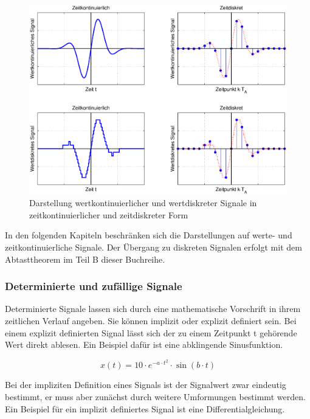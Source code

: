 \begin{figure}[H]
  \includegraphics[width=1.0\textwidth]{Kapitel1/Bilder/image1.eps}
  \caption{Darstellung wertkontinuierlicher und wertdiskreter Signale in zeitkontinuierlicher und zeitdiskreter Form}
  \label{fig:DiskreKontinuerlich}
\end{figure}

\noindent In den folgenden Kapiteln beschränken sich die Darstellungen auf werte- und zeitkontinuierliche Signale. Der Übergang zu diskreten Signalen erfolgt mit dem Abtasttheorem im Teil B dieser Buchreihe.


\subsubsection{ Determinierte und zuf\"{a}llige Signale}
Determinierte Signale lassen sich durch eine mathematische Vorschrift in ihrem zeitlichen Verlauf angeben. Sie k\"{o}nnen implizit oder explizit definiert sein. Bei einem explizit definierten Signal l\"{a}sst sich der zu einem Zeitpunkt t geh\"{o}rende Wert direkt ablesen. Ein Beispiel daf\"{u}r ist eine abklingende Sinusfunktion.

\begin{equation}\label{eq:oneone}
x(t)=10\cdot e^{\displaystyle -a\cdot t^{2}} \cdot\sin (b\cdot t)
\end{equation}

\noindent Bei der impliziten Definition eines Signals ist der Signalwert zwar eindeutig bestimmt, er muss aber zun\"{a}chst durch weitere Umformungen bestimmt werden. Ein Beispiel f\"{u}r ein implizit definiertes Signal ist eine Differentialgleichung.

